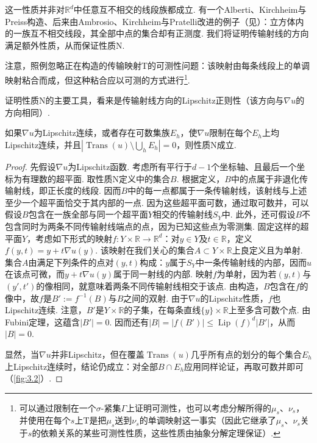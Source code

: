 这一性质并非对$\mathbb R^d$中任意互不相交的线段族都成立. 有一个Alberti、Kirchheim与Preiss构造、后来由Ambrosio、Kirchheim与Pratelli改进的例子（见\cite{b14}）：立方体内的一族互不相交线段，其全部中点的集合却有正测度. 我们将证明传输射线的方向满足额外性质，从而保证性质N.

注意，照例忽略正在构造的传输映射$\mathrm T$的可测性问题：该映射由每条线段上的单调映射粘合而成，但这种粘合应以可测的方式进行\footnote{可以通过限制在一个$\sigma$-紧集$\Gamma$上证明可测性，也可以考虑分解所得的$\mu_s$、$\nu_s$，并使用在每个$s$上$\mathrm T$是把$\mu_s$送到$\nu_s$的单调映射这一事实（因此它继承了$\mu_s$、$\nu_s$关于$s$的依赖关系的某些可测性性质，这些性质由抽象分解定理保证）.}.

证明性质N的主要工具，看来是传输射线方向的Lipschitz正则性（该方向与$\nabla u$的方向相同）.

\begin{theorem}\label{obj:3.12}
如果$\nabla u$为Lipschitz连续，或者存在可数集族$E_h$，使$\nabla u$限制在每个$E_h$上均Lipschitz连续，并且$|\operatorname{Trans}(u)\setminus\bigcup_hE_h|=0$，则性质N成立.
\end{theorem}
\begin{proof}
先假设$\nabla u$为Lipschitz函数. 考虑所有平行于$d-1$个坐标轴、且最后一个坐标为有理数的超平面. 取性质N定义中的集合$B$. 根据定义，$B$中的点属于非退化传输射线，即正长度的线段. 因而$B$中的每一点都属于一条传输射线，该射线与上述至少一个超平面恰交于其内部的一点. 因为这些超平面可数，通过取可数并，可以假设$B$包含在一族全部与同一个超平面$Y$相交的传输射线$S_Y$中. 此外，还可假设$B$不包含同时为两条不同传输射线端点的点，因为已知这些点为零测集. 固定这样的超平面$Y$，考虑如下形式的映射$f:Y\times\mathbb R\to\mathbb R^d$：对$y\in Y$及$t\in\mathbb R$，定义$f(y,t)=y+t\nabla u(y)$. 该映射在我们关心的集合$A\subset Y\times\mathbb R$上良定义且为单射. 集合$A$由满足下列条件的点对$(y,t)$构成：$y$属于$S_Y$中一条传输射线的内部，因而$u$在该点可微，而$y+t\nabla u(y)$属于同一射线的内部. 映射$f$为单射，因为若$(y,t)$与$(y',t')$的像相同，就意味着两条不同传输射线相交于该点. 由构造，$B$包含在$f$的像中，故$f$是$B':=f^{-1}(B)$与$B$之间的双射. 由于$\nabla u$的Lipschitz性质，$f$也Lipschitz连续. 注意，$B'$是$Y\times\mathbb R$的子集，在每条直线$\{y\}\times\mathbb R$上至多含可数个点. 由Fubini定理，这蕴含$|B'|=0$. 因而还有$|B|=|f(B')|\le\operatorname{Lip}(f)^d|B'|$，从而$|B|=0$.

显然，当$\nabla u$并非Lipschitz，但在覆盖$\operatorname{Trans}(u)$几乎所有点的划分的每个集合$E_h$上Lipschitz连续时，结论仍成立：对全部$B\cap E_h$应用同样论证，再取可数并即可（\autoref{fig:3.2}）.
\end{proof}

